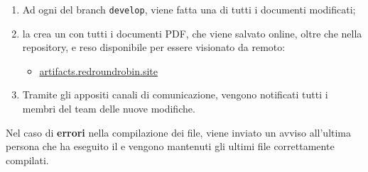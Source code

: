 	\begin{enumerate}
		\item Ad ogni  del branch \verb!develop!, viene fatta una  di tutti i documenti modificati;
		\item la  crea un  con tutti i documenti PDF, che viene salvato online, oltre che nella repository, e reso disponibile per essere visionato da remoto:
		\begin{itemize}
			\item \href{https://artifacts.redroundrobin.site}{artifacts.redroundrobin.site}
		\end{itemize}
		\item Tramite gli appositi canali di comunicazione, vengono notificati tutti i membri del team delle nuove modifiche.
	\end{enumerate}

	Nel caso di \textbf{errori} nella compilazione dei file, viene inviato un avviso all'ultima persona che ha eseguito il  e vengono mantenuti gli ultimi file correttamente compilati.
